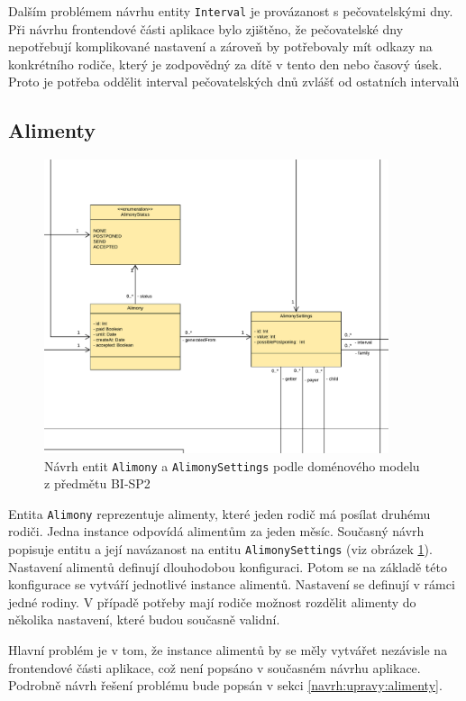         Dalším problémem návrhu entity \verb|Interval| je provázanost s pečovatelskými dny. Při návrhu frontendové části aplikace bylo zjištěno, že pečovatelské dny nepotřebují komplikované nastavení a zároveň by potřebovaly mít odkazy na konkrétního rodiče, který je zodpovědný za dítě v tento den nebo časový úsek. Proto je potřeba oddělit interval pečovatelských dnů zvlášť od ostatních intervalů
    
    \subsection{Alimenty}
        \begin{figure}\centering
	        \includegraphics[width=0.9\textwidth]{pdfs/AlimonyDraft1}
	        \caption[Návrh entit \texttt{Alimony} a \texttt{AlimonySettings}]{Návrh entit \texttt{Alimony} a \texttt{AlimonySettings} podle doménového modelu z předmětu BI-SP2}\label{image:aliomny-draft1}
        \end{figure}
        Entita \verb|Alimony| reprezentuje alimenty, které jeden rodič má posílat druhému rodiči. Jedna instance odpovídá alimentům za jeden měsíc. Současný návrh popisuje entitu a její navázanost na entitu \verb|AlimonySettings| (viz obrázek \ref{image:aliomny-draft1}). Nastavení alimentů definují dlouhodobou konfiguraci. Potom se na základě této konfigurace se vytváří jednotlivé instance alimentů. Nastavení se definují v rámci jedné rodiny. V případě potřeby mají rodiče možnost rozdělit alimenty do několika nastavení, které budou současně validní.
        
        Hlavní problém je v tom, že instance alimentů by se měly vytvářet nezávisle na frontendové části aplikace, což není popsáno v současném návrhu aplikace. Podrobně návrh řešení problému bude popsán v sekci \ref{navrh:upravy:alimenty}.
        
